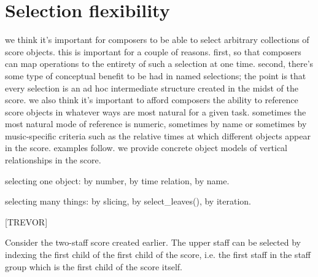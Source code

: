 \documentclass{article}
\begin{document}
\section{Selection flexibility} \label{sec:selections}

we think it's important for composers to be able to select arbitrary
collections of score objects. this is important for a couple of reasons. first,
so that composers can map operations to the entirety of such a selection at one
time. second, there's some type of conceptual benefit to be had in named
selections; the point is that every selection is an ad hoc intermediate
structure created in the midst of the score. we also think it's important to
afford composers the ability to reference score objects in whatever ways are
most natural for a given task. sometimes the most natural mode of reference is
numeric, sometimes by name or sometimes by music-specific criteria such as the
relative times at which different objects appear in the score. examples follow.
we provide concrete object models of vertical relationships in the score.

selecting one object: by number, by time relation, by name.

selecting many things: by slicing, by select\_leaves(), by iteration.

[TREVOR]


Consider the two-staff score created earlier. The upper staff can be selected
by indexing the first child of the first child of the score, i.e. the first
staff in the staff group which is the first child of the score itself.

\end{document}
